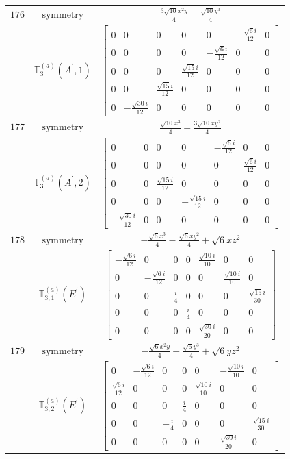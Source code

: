 \documentclass[fleqn,8pt,landscape]{jsarticle}
\begin{document}
\begin{longtable}{ccc}
$ 176 $ & $ \text{symmetry} $ & $ \frac{3 \sqrt{10} x^{2} y}{4} - \frac{\sqrt{10} y^{3}}{4} $ \\
$  $ & $ \mathbb{T}_{3}^{(a)}(A^{\prime},1) $ & $ \begin{bmatrix} 0 & 0 & 0 & 0 & 0 & - \frac{\sqrt{6} i}{12} & 0 \\ 0 & 0 & 0 & 0 & - \frac{\sqrt{6} i}{12} & 0 & 0 \\ 0 & 0 & 0 & \frac{\sqrt{15} i}{12} & 0 & 0 & 0 \\ 0 & 0 & \frac{\sqrt{15} i}{12} & 0 & 0 & 0 & 0 \\ 0 & - \frac{\sqrt{30} i}{12} & 0 & 0 & 0 & 0 & 0 \end{bmatrix} $ \\ \hline
$ 177 $ & $ \text{symmetry} $ & $ \frac{\sqrt{10} x^{3}}{4} - \frac{3 \sqrt{10} x y^{2}}{4} $ \\
$  $ & $ \mathbb{T}_{3}^{(a)}(A^{\prime},2) $ & $ \begin{bmatrix} 0 & 0 & 0 & 0 & - \frac{\sqrt{6} i}{12} & 0 & 0 \\ 0 & 0 & 0 & 0 & 0 & \frac{\sqrt{6} i}{12} & 0 \\ 0 & 0 & \frac{\sqrt{15} i}{12} & 0 & 0 & 0 & 0 \\ 0 & 0 & 0 & - \frac{\sqrt{15} i}{12} & 0 & 0 & 0 \\ - \frac{\sqrt{30} i}{12} & 0 & 0 & 0 & 0 & 0 & 0 \end{bmatrix} $ \\ \hline
$ 178 $ & $ \text{symmetry} $ & $ - \frac{\sqrt{6} x^{3}}{4} - \frac{\sqrt{6} x y^{2}}{4} + \sqrt{6} x z^{2} $ \\
$  $ & $ \mathbb{T}_{3,1}^{(a)}(E^{\prime}) $ & $ \begin{bmatrix} - \frac{\sqrt{6} i}{12} & 0 & 0 & 0 & \frac{\sqrt{10} i}{10} & 0 & 0 \\ 0 & - \frac{\sqrt{6} i}{12} & 0 & 0 & 0 & \frac{\sqrt{10} i}{10} & 0 \\ 0 & 0 & \frac{i}{4} & 0 & 0 & 0 & \frac{\sqrt{15} i}{30} \\ 0 & 0 & 0 & \frac{i}{4} & 0 & 0 & 0 \\ 0 & 0 & 0 & 0 & \frac{\sqrt{30} i}{20} & 0 & 0 \end{bmatrix} $ \\ \hline
$ 179 $ & $ \text{symmetry} $ & $ - \frac{\sqrt{6} x^{2} y}{4} - \frac{\sqrt{6} y^{3}}{4} + \sqrt{6} y z^{2} $ \\
$  $ & $ \mathbb{T}_{3,2}^{(a)}(E^{\prime}) $ & $ \begin{bmatrix} 0 & - \frac{\sqrt{6} i}{12} & 0 & 0 & 0 & - \frac{\sqrt{10} i}{10} & 0 \\ \frac{\sqrt{6} i}{12} & 0 & 0 & 0 & \frac{\sqrt{10} i}{10} & 0 & 0 \\ 0 & 0 & 0 & \frac{i}{4} & 0 & 0 & 0 \\ 0 & 0 & - \frac{i}{4} & 0 & 0 & 0 & \frac{\sqrt{15} i}{30} \\ 0 & 0 & 0 & 0 & 0 & \frac{\sqrt{30} i}{20} & 0 \end{bmatrix} $ \\ \hline

\end{longtable}
\end{document}
